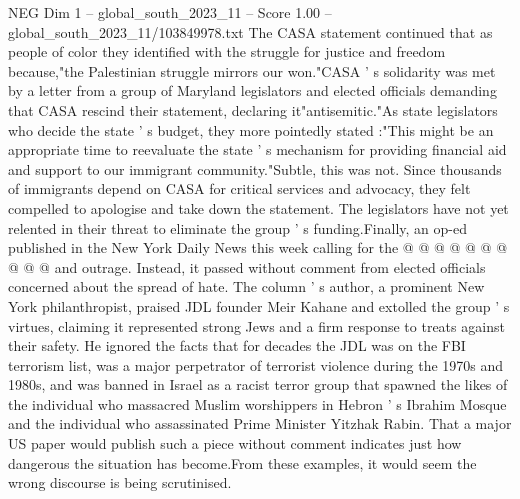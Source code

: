 \begin{textsample}{NEG Dim 1 – global\_south\_2023\_11 – Score 1.00 – global\_south\_2023\_11/103849978.txt}
The CASA statement continued that as people of color they identified with the struggle for justice and freedom because,"the Palestinian struggle mirrors our won."CASA ' s solidarity was met by a letter from a group of Maryland legislators and elected officials demanding that CASA rescind their statement, declaring it"antisemitic."As state legislators who decide the state ' s budget, they more pointedly stated :"This might be an appropriate time to reevaluate the state ' s mechanism for providing financial aid and support to our immigrant community."Subtle, this was not.
Since thousands of immigrants depend on CASA for critical services and advocacy, they felt compelled to apologise and take down the statement.
The legislators have not yet relented in their threat to eliminate the group ' s funding.Finally, an op-ed published in the New York Daily News this week calling for the @ @ @ @ @ @ @ @ @ @ and outrage.
Instead, it passed without comment from elected officials concerned about the spread of hate.
The column ' s author, a prominent New York philanthropist, praised JDL founder Meir Kahane and extolled the group ' s virtues, claiming it represented strong Jews and a firm response to treats against their safety.
He ignored the facts that for decades the JDL was on the FBI terrorism list, was a major perpetrator of terrorist violence during the 1970s and 1980s, and was banned in Israel as a racist terror group that spawned the likes of the individual who massacred Muslim worshippers in Hebron ' s Ibrahim Mosque and the individual who assassinated Prime Minister Yitzhak Rabin.
That a major US paper would publish such a piece without comment indicates just how dangerous the situation has become.From these examples, it would seem the wrong discourse is being scrutinised.

\end{textsample}
